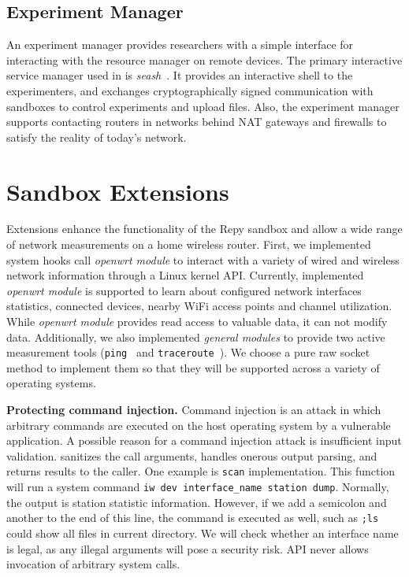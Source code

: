 \subsection{Experiment Manager}
\label{sec.seash}
An experiment manager provides researchers with a simple interface for interacting with the resource manager on remote devices. The primary interactive service manager used in \sysname is \textit{seash}~\cite{seash}. It provides an interactive shell to the experimenters, and exchanges cryptographically signed communication with sandboxes to control experiments and upload files. Also, the experiment manager supports contacting routers in networks behind NAT gateways and firewalls to satisfy the reality of today's network.

\section{Sandbox Extensions}
\label{sec.extensions}
Extensions enhance the functionality of the Repy sandbox and allow a wide range of network measurements on a home wireless router. First, we implemented system hooks call \textit{openwrt module} to interact with a variety of wired and wireless network information through a Linux kernel API. Currently, implemented \textit{openwrt module} is supported to learn about configured network interfaces statistics, connected devices, nearby WiFi access points and channel utilization. While \textit{openwrt module} provides read access to valuable data, it can not modify data. Additionally, we also implemented \textit{general modules} to provide two active measurement tools (\texttt{ping}~\cite{pingcode} and \texttt{traceroute}~\cite{traceroutecode}). We choose a pure raw socket method to implement them so that they will be supported across a variety of operating systems. 

\textbf{Protecting command injection.} Command injection is an attack in which arbitrary commands are executed on the host operating system by a vulnerable application. A possible reason for a command injection attack is insufficient input validation. \sysname sanitizes the call arguments, handles onerous output parsing, and returns results to the caller. One example is \texttt{scan} implementation. This function will run a system command \texttt{iw dev interface\_name station dump}. Normally, the output is station statistic information. However, if we add a semicolon and another to the end of this line, the command is executed as well, such as \texttt{;ls} could show all files in current directory. We will check whether an interface name is legal, as any illegal arguments will pose a security risk. \sysname API never allows invocation of arbitrary system calls.

